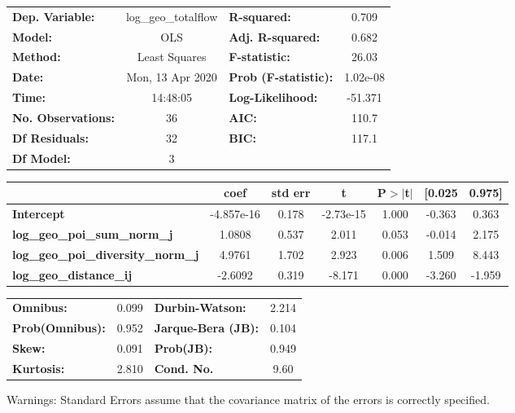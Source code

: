\begin{center}
\begin{tabular}{lclc}
\toprule
\textbf{Dep. Variable:}                    & log\_geo\_totalflow & \textbf{  R-squared:         } &     0.709   \\
\textbf{Model:}                            &         OLS         & \textbf{  Adj. R-squared:    } &     0.682   \\
\textbf{Method:}                           &    Least Squares    & \textbf{  F-statistic:       } &     26.03   \\
\textbf{Date:}                             &   Mon, 13 Apr 2020  & \textbf{  Prob (F-statistic):} &  1.02e-08   \\
\textbf{Time:}                             &       14:48:05      & \textbf{  Log-Likelihood:    } &   -51.371   \\
\textbf{No. Observations:}                 &            36       & \textbf{  AIC:               } &     110.7   \\
\textbf{Df Residuals:}                     &            32       & \textbf{  BIC:               } &     117.1   \\
\textbf{Df Model:}                         &             3       & \textbf{                     } &             \\
\bottomrule
\end{tabular}
\begin{tabular}{lcccccc}
                                           & \textbf{coef} & \textbf{std err} & \textbf{t} & \textbf{P$> |$t$|$} & \textbf{[0.025} & \textbf{0.975]}  \\
\midrule
\textbf{Intercept}                         &   -4.857e-16  &        0.178     & -2.73e-15  &         1.000        &       -0.363    &        0.363     \\
\textbf{log\_geo\_poi\_sum\_norm\_j}       &       1.0808  &        0.537     &     2.011  &         0.053        &       -0.014    &        2.175     \\
\textbf{log\_geo\_poi\_diversity\_norm\_j} &       4.9761  &        1.702     &     2.923  &         0.006        &        1.509    &        8.443     \\
\textbf{log\_geo\_distance\_ij}            &      -2.6092  &        0.319     &    -8.171  &         0.000        &       -3.260    &       -1.959     \\
\bottomrule
\end{tabular}
\begin{tabular}{lclc}
\textbf{Omnibus:}       &  0.099 & \textbf{  Durbin-Watson:     } &    2.214  \\
\textbf{Prob(Omnibus):} &  0.952 & \textbf{  Jarque-Bera (JB):  } &    0.104  \\
\textbf{Skew:}          &  0.091 & \textbf{  Prob(JB):          } &    0.949  \\
\textbf{Kurtosis:}      &  2.810 & \textbf{  Cond. No.          } &     9.60  \\
\bottomrule
\end{tabular}
\end{center}

Warnings: \newline
 [1] Standard Errors assume that the covariance matrix of the errors is correctly specified.